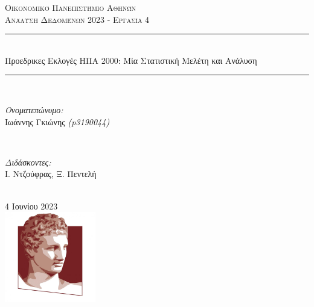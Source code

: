 \documentclass[10pt, letterpaper]{article}
\begin{document}
\renewcommand\refname{Αναφορές}
\renewcommand\contentsname{Περιεχόμενα}

    \begin{titlepage}

        \newcommand{\HRule}{\rule{\linewidth}{0.5mm}}
        
        \center
        
        \textsc{\LARGE Οικονομικό Πανεπιστήμιο Αθηνών}\\[1.5cm]
        \textsc{\large Ανάλυση Δεδομένων 2023 - Εργασία 4}\\[0.5cm]
        
        \HRule \\[0.4cm]
        {\huge Προεδρικες Εκλογές ΗΠΑ 2000: Μία Στατιστική Μελέτη και Ανάλυση }\\[0.4cm] 
        \HRule \\[1.5cm]
        
        \begin{minipage}{0.4\textwidth}
        \begin{flushleft} \large
        \emph{Ονοματεπώνυμο:}\\
        Ιωάννης Γκιώνης \textit{(p3190044)} \\
        \end{flushleft}
        \end{minipage}
        ~
        \begin{minipage}{0.4\textwidth}
        \begin{flushright} \large
        \emph{Διδάσκοντες:} \\
        Ι. Ντζούφρας, Ξ. Πεντελή \\
        \end{flushright}
        \end{minipage}\\[2cm]
        
        {\large 4 Ιουνίου 2023}\\[2cm]
        
        \includegraphics[width=150px, keepaspectratio]{resources/logo_aueb.png}\\[1cm] 
        
        \vfill 
    
    \end{titlepage}
\end{document}
